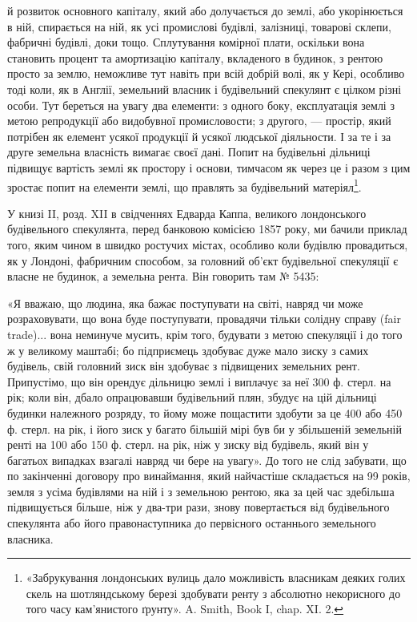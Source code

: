 й розвиток основного капіталу, який або долучається до землі, або укорінюється
в ній, спирається на ній, як усі промислові будівлі, залізниці, товарові склепи,
фабричні будівлі, доки тощо. Сплутування комірної плати, оскільки вона становить
процент та амортизацію капіталу, вкладеного в будинок, з рентою просто за
землю, неможливе тут навіть при всій добрій волі, як у Кері, особливо тоді
коли, як в Англії, земельний власник і будівельний спекулянт є цілком різні
особи. Тут береться на увагу два елементи: з одного боку, експлуатація землі
з метою репродукції або видобувної промисловости; з другого, — простір, який
потрібен як елемент усякої продукції й усякої людської діяльности. І за те і за
друге земельна власність вимагає своєї дані. Попит на будівельні дільниці підвищує
вартість землі як простору і основи, тимчасом як через це і разом
з цим зростає попит на елементи землі, що правлять за будівельний матеріял\footnote{
«Забрукування лондонських вулиць дало можливість власникам деяких голих скель на шотляндському
березі здобувати ренту з абсолютно некорисного до того часу кам’янистого ґрунту». A. Smith, Book I,
chap. XI. 2.
}.

У книзі II, розд. XII в свідченнях Едварда Каппа, великого лондонського
будівельного спекулянта, перед банковою комісією 1857 року, ми бачили приклад
того, яким чином в швидко ростучих містах, особливо коли будівлю провадиться,
як у Лондоні, фабричним способом, за головний об’єкт будівельної
спекуляції є власне не будинок, а земельна рента. Він говорить там № 5435:

«Я вважаю, що людина, яка бажає поступувати на світі, навряд чи може
розраховувати, що вона буде поступувати, провадячи тільки солідну справу (fair
trade)... вона неминуче мусить, крім того, будувати з метою спекуляції і до
того ж у великому маштабі; бо підприємець здобуває дуже мало зиску з самих
будівель, свій головний зиск він здобуває з підвищених земельних рент. Припустімо,
що він орендує дільницю землі і виплачує за неї 300 ф. стерл. на рік;
коли він, дбало опрацювавши будівельний плян, збудує на цій дільниці будинки
належного розряду, то йому може пощастити здобути за це 400 або 450 ф. стерл.
на рік, і його зиск у багато більшій мірі був би у збільшеній земельній ренті
на 100 або 150 ф. стерл. на рік, ніж у зиску від будівель, який він у багатьох
випадках взагалі навряд чи бере на увагу». До того не слід забувати, що
по закінченні договору про винаймання, який найчастіше складається на 99 років,
земля з усіма будівлями на ній і з земельною рентою, яка за цей час
здебільша підвищується більше, ніж у два-три рази, знову повертається від
будівельного спекулянта або його правонаступника до первісного останнього
земельного власника.

